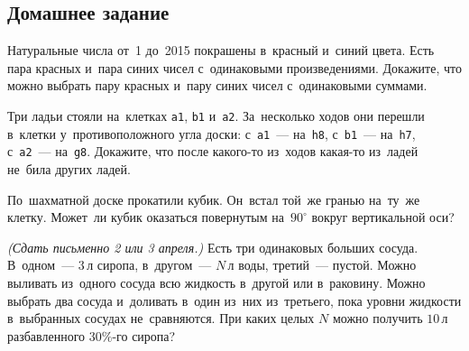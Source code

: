 

\subsection*{Домашнее задание}



\begin{problems}

\item
Натуральные числа от~1 до~2015 покрашены в~красный и~синий цвета.
Есть пара красных и~пара синих чисел с~одинаковыми произведениями.
Докажите, что можно выбрать пару красных и~пару синих чисел с~одинаковыми
суммами.

Три ладьи стояли на~клетках \texttt{a1}, \texttt{b1} и~\texttt{a2}.
За~несколько ходов они перешли в~клетки у~противоположного угла доски:
с~\texttt{a1}~--- на~\texttt{h8},
с~\texttt{b1}~--- на~\texttt{h7},
с~\texttt{a2}~--- на~\texttt{g8}.
Докажите, что после какого-то из~ходов какая-то из~ладей не~била других ладей.

\item
По~шахматной доске прокатили кубик.
Он~встал той~же гранью на~ту~же клетку.
Может~ли кубик оказаться повернутым на~$90^\circ$ вокруг вертикальной оси?


\item
\emph{(Сдать письменно 2 или 3 апреля.)}
Есть три одинаковых больших сосуда.
В~одном~--- $3\,\text{л}$ сиропа, в~другом~--- $N\,\text{л}$ воды,
третий~--- пустой.
Можно выливать из~одного сосуда всю жидкость в~другой или в~раковину.
Можно выбрать два сосуда и~доливать в~один из~них из~третьего, пока уровни
жидкости в~выбранных сосудах не~сравняются.
При каких целых $N$ можно получить $10\,\text{л}$ разбавленного $30\%$-го
сиропа?

\end{problems}

